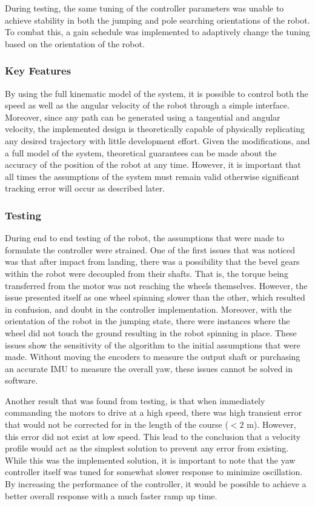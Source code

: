 \documentclass[ece]{uw-wkrpt}
\begin{document}
During testing, the same tuning of the controller parameters was unable to achieve stability in both the jumping and pole searching orientations of the robot. To combat this, a gain schedule was implemented to adaptively change the tuning based on the orientation of the robot. 

\subsubsection{Key Features}

By using the full kinematic model of the system, it is possible to control both the speed as well as the angular velocity of the robot through a simple interface. Moreover, since any path can be generated using a tangential and angular velocity, the implemented design is theoretically capable of physically replicating any desired trajectory with little development effort. Given the modifications, and a full model of the system, theoretical guarantees can be made about the accuracy of the position of the robot at any time. However, it is important that all times the assumptions of the system must remain valid otherwise significant tracking error will occur as described later.

\subsubsection{Testing}

During end to end testing of the robot, the assumptions that were made to formulate the controller were strained. One of the first issues that was noticed was that after impact from landing, there was a possibility that the bevel gears within the robot were decoupled from their shafts. That is, the torque being transferred from the motor was not reaching the wheels themselves. However, the issue presented itself as one wheel spinning slower than the other, which resulted in confusion, and doubt in the controller implementation. Moreover, with the orientation of the robot in the jumping state, there were instances where the wheel did not touch the ground resulting in the robot spinning in place. These issues show the sensitivity of the algorithm to the initial assumptions that were made. Without moving the encoders to measure the output shaft or purchasing an accurate IMU to measure the overall yaw, these issues cannot be solved in software. 

Another result that was found from testing, is that when immediately commanding the motors to drive at a high speed, there was high transient error that would not be corrected for in the length of the course ($<2$ m). However, this error did not exist at low speed. This lead to the conclusion that a velocity profile would act as the simplest solution to prevent any error from existing. While this was the implemented solution, it is important to note that the yaw controller itself was tuned for somewhat slower response to minimize oscillation. By increasing the performance of the controller, it would be possible to achieve a better overall response with a much faster ramp up time. 
\end{document}
